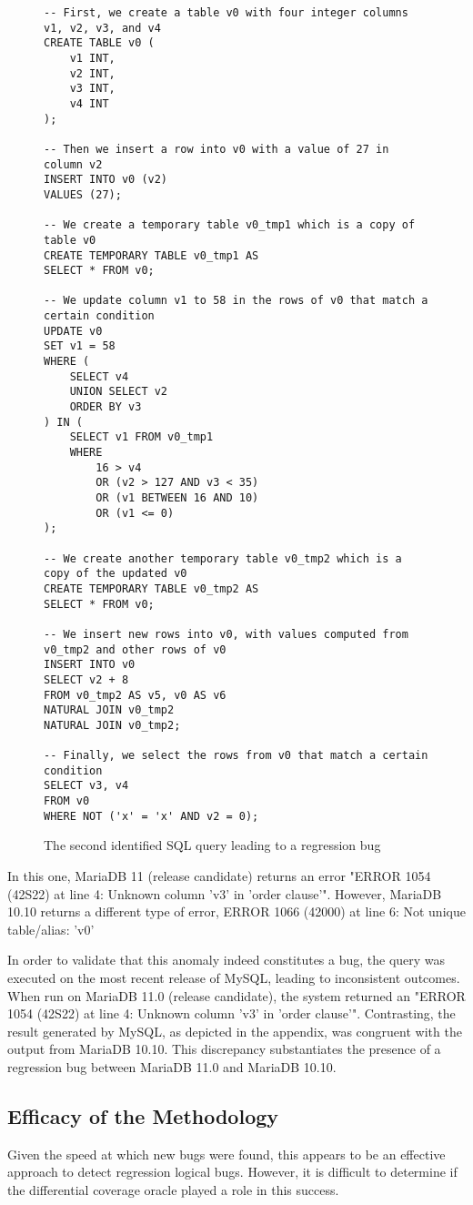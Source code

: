 \documentclass[sigconf]{acmart}
\begin{document}
\begin{figure}
\centering
\begin{lstlisting}
-- First, we create a table v0 with four integer columns v1, v2, v3, and v4
CREATE TABLE v0 (
    v1 INT,
    v2 INT,
    v3 INT,
    v4 INT
);

-- Then we insert a row into v0 with a value of 27 in column v2
INSERT INTO v0 (v2) 
VALUES (27);

-- We create a temporary table v0_tmp1 which is a copy of table v0
CREATE TEMPORARY TABLE v0_tmp1 AS 
SELECT * FROM v0;

-- We update column v1 to 58 in the rows of v0 that match a certain condition
UPDATE v0 
SET v1 = 58 
WHERE (
    SELECT v4 
    UNION SELECT v2 
    ORDER BY v3
) IN (
    SELECT v1 FROM v0_tmp1 
    WHERE 
        16 > v4 
        OR (v2 > 127 AND v3 < 35) 
        OR (v1 BETWEEN 16 AND 10) 
        OR (v1 <= 0)
);

-- We create another temporary table v0_tmp2 which is a copy of the updated v0
CREATE TEMPORARY TABLE v0_tmp2 AS 
SELECT * FROM v0;

-- We insert new rows into v0, with values computed from v0_tmp2 and other rows of v0
INSERT INTO v0 
SELECT v2 + 8 
FROM v0_tmp2 AS v5, v0 AS v6 
NATURAL JOIN v0_tmp2 
NATURAL JOIN v0_tmp2;

-- Finally, we select the rows from v0 that match a certain condition
SELECT v3, v4 
FROM v0 
WHERE NOT ('x' = 'x' AND v2 = 0);
\end{lstlisting}
\caption{The second identified SQL query leading to a regression bug}
\label{fig:bug_2}
\end{figure}

In this one, MariaDB 11 (release candidate) returns an error "ERROR 1054 (42S22) at line 4: Unknown column 'v3' in 'order clause'". However, MariaDB 10.10 returns a different type of error, ERROR 1066 (42000) at line 6: Not unique table/alias: 'v0'

In order to validate that this anomaly indeed constitutes a bug, the query was executed on the most recent release of MySQL, leading to inconsistent outcomes. When run on MariaDB 11.0 (release candidate), the system returned an "ERROR 1054 (42S22) at line 4: Unknown column 'v3' in 'order clause'". Contrasting, the result generated by MySQL, as depicted in the appendix, was congruent with the output from MariaDB 10.10. This discrepancy substantiates the presence of a regression bug between MariaDB 11.0 and MariaDB 10.10.

\subsection{Efficacy of the Methodology}
Given the speed at which new bugs were found, this appears to be an effective approach to detect regression logical bugs. However, it is difficult to determine if the differential coverage oracle played a role in this success.
\end{document}
